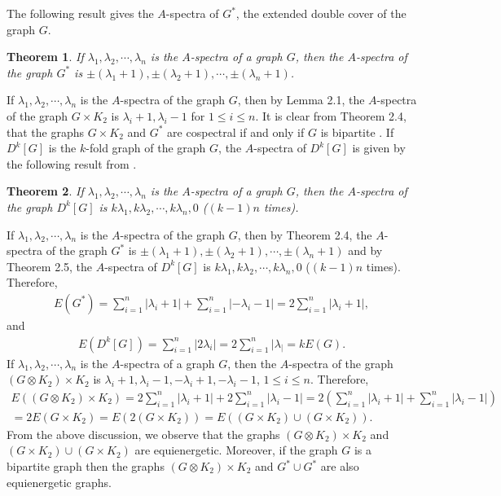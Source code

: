 \documentclass[12pt,a4paper]{amsart}
\newtheorem{theorem}{Theorem}[section]
\theoremstyle{theorem}
\theoremstyle{definition}
\numberwithin{equation}{section} \makeatletter
\begin{document}
\indent The following result \cite{c} gives the $A$-spectra of $G^*$, the extended double cover of the graph $G$.
\begin{theorem}
If $\lambda_1, \lambda_2, \cdots, \lambda_n$ is the $A$-spectra of a graph $G$, then the $A$-spectra of the graph $G^*$ is $\pm(\lambda_1+1), \pm(\lambda_2+1), \cdots, \pm(\lambda_n+1)$.
\end{theorem}
\indent If $\lambda_1, \lambda_2, \cdots, \lambda_n$ is the $A$-spectra of the graph $G$, then by Lemma 2.1, the $A$-spectra of the graph $G\times K_2$ is $\lambda_i+1, \lambda_i-1$ for $1\leq i \leq n$. It is clear from Theorem 2.4, that the graphs $G\times K_2$ and $G^*$ are cospectral if and only if $G$ is bipartite \cite{c}. If $D^k[G]$ is the $k$-fold graph of the graph $G$, the $A$-spectra of $D^k[G]$ is given by the following result from \cite{ms}.
\begin{theorem}
If $\lambda_1, \lambda_2, \cdots, \lambda_n$ is the $A$-spectra of a graph $G$, then the $A$-spectra of the graph $D^k[G]$ is $k\lambda_1, k\lambda_2, \cdots, k\lambda_n, 0$ ($(k-1)n$ times).
\end{theorem}
\indent If $\lambda_1, \lambda_2, \cdots, \lambda_n$ is the $A$-spectra of the graph $G$, then by Theorem 2.4, the $A$-spectra of the graph $G^*$ is $\pm(\lambda_1+1), \pm(\lambda_2+1), \cdots, \pm(\lambda_n+1)$ and by Theorem 2.5, the $A$-spectra of $D^k[G]$ is $k\lambda_1, k\lambda_2, \cdots, k\lambda_n, 0$ ($(k-1)n$ times). Therefore,
\begin{align*} E(G^*)=\sum\limits_{i=1}^{n}|\lambda_i+1|+\sum\limits_{i=1}^{n}|-\lambda_i-1|=2\sum\limits_{i=1}^{n}|\lambda_i+1|,
\end{align*}
and
\begin{align*}
E(D^k[G])=\sum\limits_{i=1}^{n}|2\lambda_i|=2\sum\limits_{i=1}^{n}|\lambda_|=kE(G).
\end{align*}
\indent If $\lambda_1, \lambda_2, \cdots, \lambda_n$ is the $A$-spectra of a graph $G$, then the $A$-spectra of the graph $(G\otimes K_2)\times K_2$ is $\lambda_i+1, \lambda_i-1, -\lambda_i+1, -\lambda_i-1$, $1\leq i\leq n$. Therefore,
\begin{align*}
E((G\otimes K_2)\times K_2)=2\sum_{i=1}^{n}|\lambda_i+1|+2\sum_{i=1}^{n}|\lambda_i-1|=2\left(\sum_{i=1}^{n}|\lambda_i+1|+\sum_{i=1}^{n}|\lambda_i-1| \right)\\=2E(G\times K_2)=E(2(G\times K_2))=E((G\times K_2)\cup (G\times K_2)).
\end{align*}
\indent From the above discussion, we observe that the graphs $(G\otimes K_2)\times K_2$ and $(G\times K_2)\cup (G\times K_2)$ are equienergetic. Moreover, if the graph $G$ is a bipartite graph then the graphs $(G\otimes K_2)\times K_2$ and $G^*\cup G^*$ are also equienergetic graphs.\\
\end{document}

